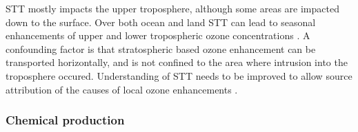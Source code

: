     STT mostly impacts the upper troposphere, although some areas are impacted 
    down to the surface.
    Over both ocean and land STT can lead to seasonal enhancements of upper and 
    lower tropospheric ozone concentrations 
    \parencite{Lin2015,Liu2017,Kuang2017}.
    A confounding factor is that stratospheric based ozone enhancement can be 
    transported horizontally, and is not confined to the area where intrusion 
    into the troposphere occured.
    Understanding of STT needs to be improved to allow source attribution of 
    the causes of local ozone enhancements \parencite{Lin2015}.
    
    
  \subsubsection{Chemical production}
    
